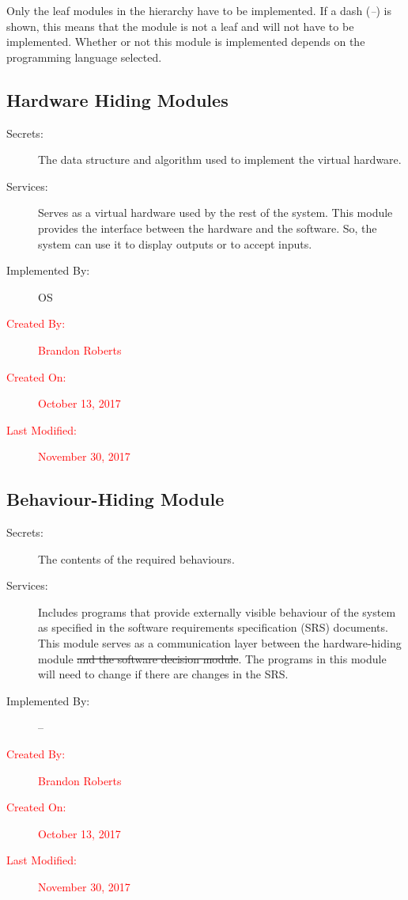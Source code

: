 \documentclass[12pt, titlepage]{article}
\begin{document}
Only the leaf modules in the
hierarchy have to be implemented. If a dash (\emph{--}) is shown, this means
that the module is not a leaf and will not have to be implemented. Whether or
not this module is implemented depends on the programming language
selected.


\subsection{Hardware Hiding Modules }
\begin{description}
\item[Secrets:]The data structure and algorithm used to implement the virtual
  hardware.
\item[Services:]Serves as a virtual hardware used by the rest of the
  system. This module provides the interface between the hardware and the
  software. So, the system can use it to display outputs or to accept inputs.
\item[Implemented By:] OS
\item[\textcolor{red}{Created By:}] \textcolor{red}{Brandon Roberts}
\item[\textcolor{red}{Created On:}] \textcolor{red}{October 13, 2017}
\item[\textcolor{red}{Last Modified:}] \textcolor{red}{November 30, 2017}
\end{description}


\subsection{Behaviour-Hiding Module}
\begin{description}
\item[Secrets:]The contents of the required behaviours.
\item[Services:]Includes programs that provide externally visible behaviour of
  the system as specified in the software requirements specification (SRS)
  documents. This module serves as a communication layer between the
  hardware-hiding module \sout{and the software decision module}. The programs in this
  module will need to change if there are changes in the SRS.
\item[Implemented By:] --
\item[\textcolor{red}{Created By:}] \textcolor{red}{Brandon Roberts}
\item[\textcolor{red}{Created On:}] \textcolor{red}{October 13, 2017}
\item[\textcolor{red}{Last Modified:}] \textcolor{red}{November 30, 2017}
\end{description}
\end{document}
